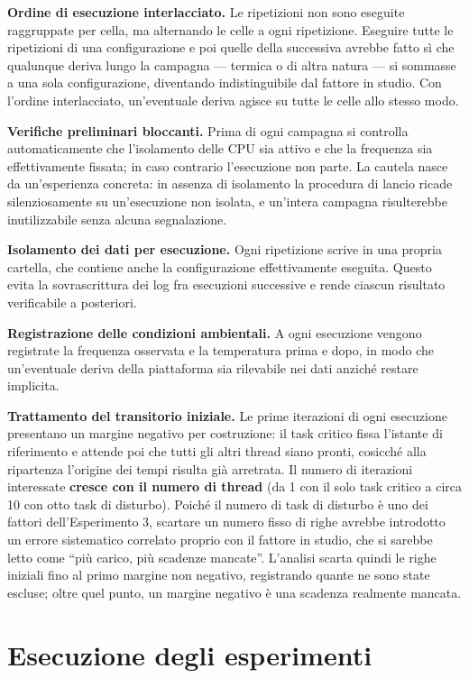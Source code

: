 \textbf{Ordine di esecuzione interlacciato.} Le ripetizioni non sono eseguite raggruppate per cella,
ma alternando le celle a ogni ripetizione. Eseguire tutte le ripetizioni di una configurazione e
poi quelle della successiva avrebbe fatto s\`i che qualunque deriva lungo la campagna --- termica o
di altra natura --- si sommasse a una sola configurazione, diventando indistinguibile dal fattore in
studio. Con l'ordine interlacciato, un'eventuale deriva agisce su tutte le celle allo stesso modo.

\textbf{Verifiche preliminari bloccanti.} Prima di ogni campagna si controlla automaticamente che
l'isolamento delle CPU sia attivo e che la frequenza sia effettivamente fissata; in caso contrario
l'esecuzione non parte. La cautela nasce da un'esperienza concreta: in assenza di isolamento la
procedura di lancio ricade silenziosamente su un'esecuzione non isolata, e un'intera campagna
risulterebbe inutilizzabile senza alcuna segnalazione.

\textbf{Isolamento dei dati per esecuzione.} Ogni ripetizione scrive in una propria cartella, che
contiene anche la configurazione effettivamente eseguita. Questo evita la sovrascrittura dei log
fra esecuzioni successive e rende ciascun risultato verificabile a posteriori.

\textbf{Registrazione delle condizioni ambientali.} A ogni esecuzione vengono registrate la
frequenza osservata e la temperatura prima e dopo, in modo che un'eventuale deriva della
piattaforma sia rilevabile nei dati anzich\'e restare implicita.

\textbf{Trattamento del transitorio iniziale.} Le prime iterazioni di ogni esecuzione presentano un
margine negativo per costruzione: il task critico fissa l'istante di riferimento e attende poi che
tutti gli altri thread siano pronti, cosicch\'e alla ripartenza l'origine dei tempi risulta gi\`a
arretrata. Il numero di iterazioni interessate \textbf{cresce con il numero di thread} (da 1 con il
solo task critico a circa 10 con otto task di disturbo). Poich\'e il numero di task di disturbo \`e
uno dei fattori dell'Esperimento 3, scartare un numero fisso di righe avrebbe introdotto un errore
sistematico correlato proprio con il fattore in studio, che si sarebbe letto come ``pi\`u carico,
pi\`u scadenze mancate''. L'analisi scarta quindi le righe iniziali fino al primo margine non
negativo, registrando quante ne sono state escluse; oltre quel punto, un margine negativo \`e una
scadenza realmente mancata.

\section{Esecuzione degli esperimenti}

